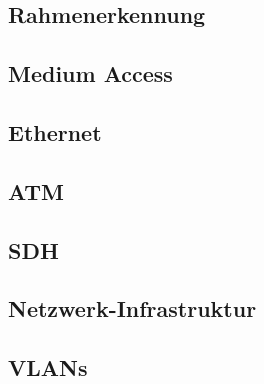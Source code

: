 \documentclass[a4paper,10pt]{scrartcl}
\begin{document}
\subsection{Rahmenerkennung}
\subsection{Medium Access}
\subsection{Ethernet}
\subsection{ATM}
\subsection{SDH}
\subsection{Netzwerk-Infrastruktur}
\subsection{VLANs}
\end{document}
